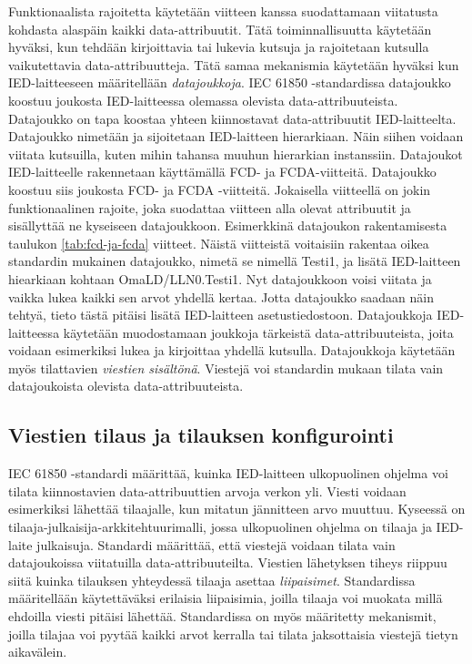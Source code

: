 Funktionaalista rajoitetta käytetään viitteen kanssa suodattamaan viitatusta kohdasta alaspäin kaikki data-attribuutit. Tätä toiminnallisuutta käytetään hyväksi, kun tehdään kirjoittavia tai lukevia kutsuja ja rajoitetaan kutsulla vaikutettavia data-attribuutteja. Tätä samaa mekanismia käytetään hyväksi kun IED-laitteeseen määritellään \emph{datajoukkoja}. IEC 61850 -standardissa datajoukko koostuu joukosta IED-laitteessa olemassa olevista data-attribuuteista. Datajoukko on tapa koostaa yhteen kiinnostavat data-attribuutit IED-laitteelta. Datajoukko nimetään ja sijoitetaan IED-laitteen hierarkiaan. Näin siihen voidaan viitata kutsuilla, kuten mihin tahansa muuhun hierarkian instanssiin. Datajoukot IED-laitteelle rakennetaan käyttämällä FCD- ja FCDA-viitteitä. Datajoukko koostuu siis joukosta FCD- ja FCDA -viitteitä. Jokaisella viitteellä on jokin funktionaalinen rajoite, joka suodattaa viitteen alla olevat attribuutit ja sisällyttää ne kyseiseen datajoukkoon. Esimerkkinä datajoukon rakentamisesta taulukon \ref{tab:fcd-ja-fcda} viitteet. Näistä viitteistä voitaisiin rakentaa oikea standardin mukainen datajoukko, nimetä se nimellä Testi1, ja lisätä IED-laitteen hiearkiaan kohtaan OmaLD/LLN0.Testi1. Nyt datajoukkoon voisi viitata ja vaikka lukea kaikki sen arvot yhdellä kertaa. Jotta datajoukko saadaan näin tehtyä, tieto tästä pitäisi lisätä IED-laitteen asetustiedostoon. Datajoukkoja IED-laitteessa käytetään muodostamaan joukkoja tärkeistä data-attribuuteista, joita voidaan esimerkiksi lukea ja kirjoittaa yhdellä kutsulla. Datajoukkoja käytetään myös tilattavien \emph{viestien sisältönä}. Viestejä voi standardin mukaan tilata vain datajoukoista olevista data-attribuuteista. \mbox{\cite[s.~61--68]{IEC61850-7-2}}


\subsection{Viestien tilaus ja tilauksen konfigurointi}
\label{ch:viestien-tilaus-ja-tilauksen-konfigurointi}
IEC 61850 -standardi määrittää, kuinka IED-laitteen ulkopuolinen ohjelma voi tilata kiinnostavien data-attribuuttien arvoja verkon yli. Viesti voidaan esimerkiksi lähettää tilaajalle, kun mitatun jännitteen arvo muuttuu. Kyseessä on tilaaja-julkaisija-arkkitehtuurimalli, jossa ulkopuolinen ohjelma on tilaaja ja IED-laite julkaisuja. Standardi määrittää, että viestejä voidaan tilata vain datajoukoissa viitatuilla data-attribuuteilta. Viestien lähetyksen tiheys riippuu siitä kuinka tilauksen yhteydessä tilaaja asettaa \emph{liipaisimet}. Standardissa määritellään käytettäväksi erilaisia liipaisimia, joilla tilaaja voi muokata millä ehdoilla viesti pitäisi lähettää. Standardissa on myös määritetty mekanismit, joilla tilajaa voi pyytää kaikki arvot kerralla tai tilata jaksottaisia viestejä tietyn aikavälein. \mbox{\cite{IEC61850-7-1}}

